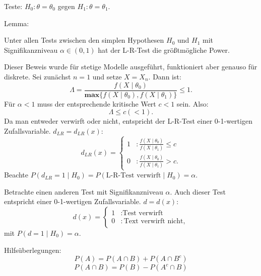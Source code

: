 \documentclass[10pt]{article}
\newcommand{\eqname}[1]{\tag*{#1}}%
\newcommand{\dlr}{d_{LR}}%
\newenvironment{BWS}[1][]
{\begin{Beweis}[frametitle=#1]}{\end{Beweis}}
\begin{document}
	Teste: $H_0: \theta = \theta_0$ gegen $H_1: \theta = \theta_1.$
	
	Lemma:
	
	Unter allen Tests zwischen den simplen Hypothesen $H_0$ und $H_1$ mit Signifikanzniveau $\alpha \in (0,1)$ hat der L-R-Test die größtmögliche Power. 
	
	\begin{BWS}[Beweis (NP-Lemma)]
		Dieser Beweis wurde für stetige Modelle ausgeführt, funktioniert aber genauso für diskrete. 
		Sei zunächst $n=1$ und setze $X = X_n$. 
		Dann ist:
		\begin{equation*}
			\Lambda = \frac{f(X\mid \theta_0)}{\textbf{max}\{f(X\mid \theta_0), f(X \mid \theta_1)\}} \leq 1.
		\end{equation*}
		Für $\alpha < 1$ muss der entsprechende kritische Wert  $c < 1$ sein. Also:
		\begin{equation*}
			\Lambda \leq c (< 1).
		\end{equation*}
		Da man entweder verwirft oder nicht, entspricht der L-R-Test einer 0-1-wertigen Zufallsvariable. $d_{LR} = d_{LR}(x)$:
		\begin{equation*}
			\dlr(x) = \begin{cases}
				1 &: \frac{f(X\mid \theta_0)}{f(X\mid \theta_1)} \leq c\\
				0 &: \frac{f(X\mid \theta_0)}{f(X\mid \theta_1)} > c.
			\end{cases}
		\end{equation*}
		Beachte $P(\dlr=1 \mid H_0) = P(\text{L-R-Test verwirft}\mid H_0) = \alpha$.
		
		Betrachte einen anderen Test mit Signifikanzniveau $\alpha$. Auch dieser Test entspricht einer 0-1-wertigen Zufallsvariable. $d = d(x)$:
		\begin{equation*}
			d(x)= \begin{cases}
				1 &: \text{Test verwirft}\\
				0 &: \text{Text verwirft nicht},
			\end{cases}
		\end{equation*}
		mit $P(d=1\mid H_0) = \alpha$.
		
		Hilfsüberlegungen:
		\begin{equation*}
			P(A) = P(A \cap B) + P(A \cap B^c) \eqname{(1)}
		\end{equation*}
		\begin{equation*}
			P(A \cap B) = P(B) - P(A^c \cap B) \eqname{(2)}
		\end{equation*}
		

\end{BWS}
\end{document}

